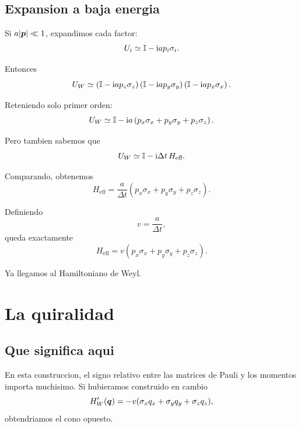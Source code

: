 \subsection{Expansion a baja energia}

Si \(a|\bm{p}|\ll 1\), expandimos cada factor:
\begin{equation}
U_i \simeq \mathbb{I} - \mathrm{i} a p_i \sigma_i.
\end{equation}

Entonces
\begin{equation}
U_W
\simeq
\left(\mathbb{I}-\mathrm{i} a p_z\sigma_z\right)
\left(\mathbb{I}-\mathrm{i} a p_y\sigma_y\right)
\left(\mathbb{I}-\mathrm{i} a p_x\sigma_x\right).
\end{equation}

Reteniendo solo primer orden:
\begin{equation}
U_W \simeq \mathbb{I} - \mathrm{i} a\left(p_x\sigma_x + p_y\sigma_y + p_z\sigma_z\right).
\label{c07:eq:Uw-expand}
\end{equation}

Pero tambien sabemos que
\begin{equation}
U_W \simeq \mathbb{I} - \mathrm{i} \Delta t\,H_{\text{eff}}.
\end{equation}

Comparando, obtenemos
\begin{equation}
H_{\text{eff}}=
\frac{a}{\Delta t}\left(p_x\sigma_x + p_y\sigma_y + p_z\sigma_z\right).
\end{equation}

Definiendo
\begin{equation}
v=\frac{a}{\Delta t},
\end{equation}
queda exactamente
\begin{equation}
H_{\text{eff}}=v\left(p_x\sigma_x + p_y\sigma_y + p_z\sigma_z\right).
\label{c07:eq:weyl-eff}
\end{equation}

Ya llegamos al Hamiltoniano de Weyl.

\section{La quiralidad}

\subsection{Que significa aqui}

En esta construccion, el signo relativo entre las matrices de Pauli y los momentos importa muchisimo. Si hubieramos construido en cambio
\begin{equation}
H'_W(\bm{q})= -v(\sigma_x q_x+\sigma_y q_y+\sigma_z q_z),
\end{equation}
obtendriamos el cono opuesto.

